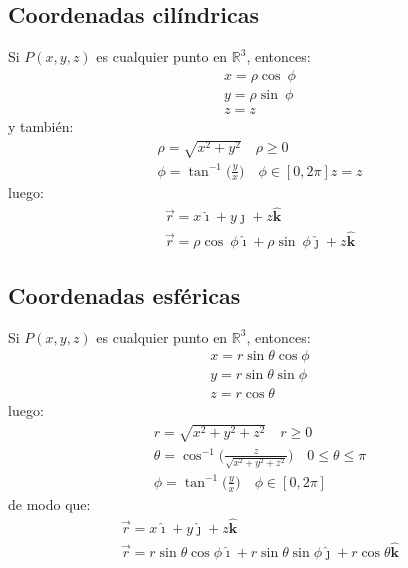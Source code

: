 \documentclass[a4paper]{article}
\newcommand{\ihat}{\boldsymbol{\hat{\imath}}}
\newcommand{\jhat}{\boldsymbol{\hat{\jmath}}}
\newcommand{\khat}{\boldsymbol{\hat{\bm{k}}}}
\begin{document}
\subsection{Coordenadas cilíndricas}
Si $P(x,y,z)$ es cualquier punto en $\mathbb{R}^3$, entonces:
\begin{gather*}
x=\rho\cos\ \phi\\
y=\rho\sin\ \phi\\
z=z
\end{gather*}
y también:
\begin{gather*}
\rho=\sqrt{x^2+y^2}\quad\rho\geq 0\\
\phi=\tan^{-1}\Big(\frac{y}{x}\Big)\quad\phi\in[0,2\pi] 
z=z
\end{gather*}
luego:
\begin{gather}
\tag{Sistema cartesiano}
\vec{r}=x\ihat+y\jhat+z\khat\\
\tag{Sistema cilindrico}
\vec{r}=\rho\cos\ \phi\ihat+\rho\sin\ \phi\jhat+z\khat
\end{gather}
\subsection{Coordenadas esféricas}
Si $P(x,y,z)$ es cualquier punto en $\mathbb{R}^3$, entonces:
\begin{gather*}
x=r\sin\theta\cos\phi\\
y=r\sin\theta\sin\phi\\
z=r\cos\theta 
\end{gather*}
luego:
\begin{gather*}
r=\sqrt{x^2+y^2+z^2}\quad r\geq 0\\
\theta=\cos^{-1}\Bigg(\frac{z}{\sqrt{x^2+y^2+z^2}}\Bigg)\quad 0\leq\theta\leq\pi\\
\phi=\tan^{-1}\Big(\frac{y}{x}\Big)\quad\phi\in[0,2\pi] 
\end{gather*}
de modo que:
\begin{gather}
\tag{Sistema cartesiano}
\vec{r}=x\ihat+y\jhat+z\khat\\
\tag{Sistema esférico}
\vec{r}=r\sin\theta\cos\phi\ihat+r\sin\theta\sin\phi\jhat+r\cos\theta\khat 
\end{gather}
\end{document}
